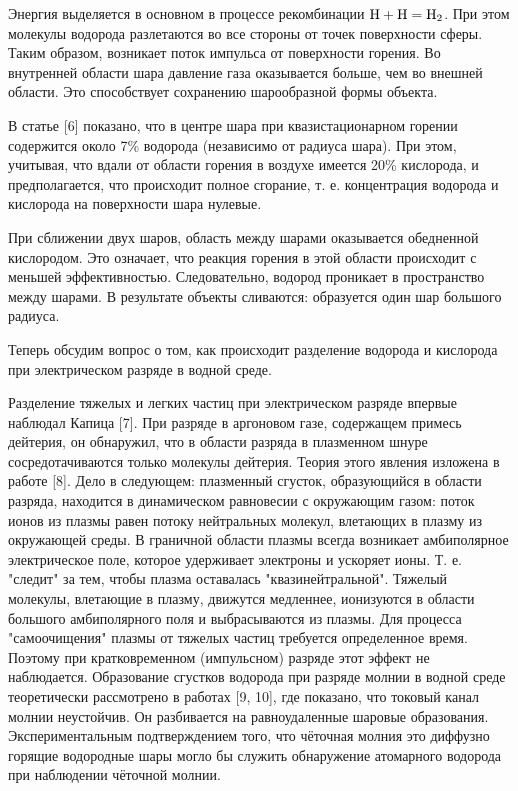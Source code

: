 \documentclass[a4paper]{article}
\begin{document}
Энергия выделяется в основном в процессе рекомбинации \(\ce{H} + \ce{H} = \ce{H2}\). При этом молекулы водорода разлетаются во все стороны от точек поверхности сферы. Таким образом, возникает поток импульса от поверхности горения. Во внутренней области шара давление газа оказывается больше, чем во внешней области. Это способствует сохранению шарообразной формы объекта. 

В статье [6] показано, что в центре шара при квазистационарном горении содержится около 7\% водорода (независимо от радиуса шара). При этом, учитывая, что вдали от области горения в воздухе имеется 20\% кислорода, и предполагается, что происходит полное сгорание, т. е. концентрация водорода и кислорода на поверхности шара нулевые.

При сближении двух шаров, область между шарами оказывается обедненной кислородом. Это означает, что реакция горения в этой области происходит с меньшей эффективностью. Следовательно, водород проникает в пространство между шарами. В результате объекты сливаются: образуется один шар большого радиуса.


Теперь обсудим вопрос о том, как происходит разделение водорода и кислорода при электрическом разряде в водной среде.

Разделение тяжелых и легких частиц при электрическом разряде впервые наблюдал Капица [7]. При разряде в аргоновом газе, содержащем примесь дейтерия, он обнаружил, что в области разряда в плазменном шнуре сосредотачиваются только молекулы дейтерия. Теория этого явления изложена в работе [8]. Дело в следующем: плазменный сгусток, образующийся в области разряда, находится в динамическом равновесии с окружающим газом: поток ионов из плазмы равен потоку нейтральных молекул, влетающих в плазму из окружающей среды. В граничной области плазмы всегда возникает амбиполярное электрическое поле, которое удерживает электроны и ускоряет ионы. Т. е. "следит" за тем, чтобы плазма оставалась "квазинейтральной". Тяжелый молекулы, влетающие в плазму, движутся медленнее, ионизуются в области большого амбиполярного поля и выбрасываются из плазмы. Для процесса "самоочищения" плазмы от тяжелых частиц требуется определенное время. Поэтому при кратковременном (импульсном) разряде этот эффект не наблюдается. Образование сгустков водорода при разряде молнии в водной среде теоретически рассмотрено в работах [9, 10], где показано, что токовый канал молнии неустойчив. Он разбивается на равноудаленные шаровые образования. Экспериментальным подтверждением того, что чёточная молния это диффузно горящие водородные шары могло бы служить обнаружение атомарного водорода при наблюдении чёточной молнии.
\end{document}
